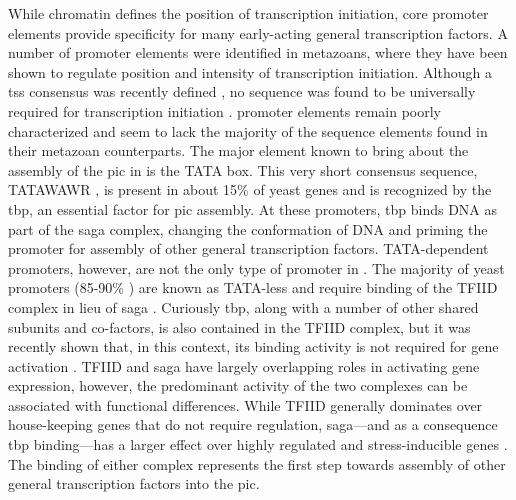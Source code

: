 While chromatin defines the position of transcription initiation, core promoter elements provide specificity for many early-acting general transcription factors. 
A number of promoter elements were identified in metazoans, where they have been shown to regulate position and intensity of transcription initiation.
Although a \gls{tss} consensus was recently defined \cite{malabat:2015:quality}, no sequence was found to be universally required for transcription initiation \cite{butler:2002:RNA}.
\cer{} promoter elements remain poorly characterized and seem to lack the majority of the sequence elements found in their metazoan counterparts. 
The major element known to bring about the assembly of the \gls{pic} in \cer{} is the TATA box.
This very short consensus sequence, TATAWAWR \citep{basehoar:2004:identification}, is present in about 15\% of yeast genes \cite{kamenova:2014:mutations} and is recognized by the \gls{tbp}, an essential factor for \gls{pic} assembly. 
At these promoters, \gls{tbp} binds DNA as part of the \gls{saga} complex, changing the conformation of DNA and priming the promoter for assembly of other general transcription factors. 
TATA-dependent promoters, however, are not the only type of promoter in \cer{}. 
The majority of yeast promoters (85-90\% )  are known as TATA-less and require binding of the TFIID complex in lieu of \gls{saga} \citep{rhee:2012:genomewide}. 
Curiously \gls{tbp}, along with a number of other shared subunits and co-factors, is also contained in the TFIID complex, but it was recently shown that, in this context, its binding activity is not required for gene activation \cite{kamenova:2014:mutations}.
TFIID and \gls{saga} have largely overlapping roles in activating gene expression, however, the predominant activity of the two complexes can be associated with functional differences.
While TFIID generally dominates over house-keeping genes that do not require regulation, \gls{saga}---and as a consequence \gls{tbp} binding---has a larger effect over highly regulated and stress-inducible genes \citep{huisinga:2004:genomewide}.
The binding of either complex represents the first step towards assembly of other general transcription factors into the \gls{pic}.

